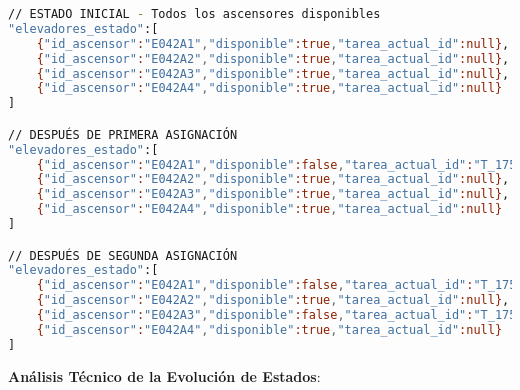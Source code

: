 \begin{lstlisting}[language=bash,caption={Evolución de Estados - Edificio E042},label={lst:evolucion-estados}]
// ESTADO INICIAL - Todos los ascensores disponibles
"elevadores_estado":[
    {"id_ascensor":"E042A1","disponible":true,"tarea_actual_id":null},
    {"id_ascensor":"E042A2","disponible":true,"tarea_actual_id":null},
    {"id_ascensor":"E042A3","disponible":true,"tarea_actual_id":null},
    {"id_ascensor":"E042A4","disponible":true,"tarea_actual_id":null}
]

// DESPUÉS DE PRIMERA ASIGNACIÓN
"elevadores_estado":[
    {"id_ascensor":"E042A1","disponible":false,"tarea_actual_id":"T_1750186596712"},
    {"id_ascensor":"E042A2","disponible":true,"tarea_actual_id":null},
    {"id_ascensor":"E042A3","disponible":true,"tarea_actual_id":null},
    {"id_ascensor":"E042A4","disponible":true,"tarea_actual_id":null}
]

// DESPUÉS DE SEGUNDA ASIGNACIÓN
"elevadores_estado":[
    {"id_ascensor":"E042A1","disponible":false,"tarea_actual_id":"T_1750186596712"},
    {"id_ascensor":"E042A2","disponible":true,"tarea_actual_id":null},
    {"id_ascensor":"E042A3","disponible":false,"tarea_actual_id":"T_1750186597329"},
    {"id_ascensor":"E042A4","disponible":true,"tarea_actual_id":null}
]
\end{lstlisting}

\textbf{Análisis Técnico de la Evolución de Estados}:

